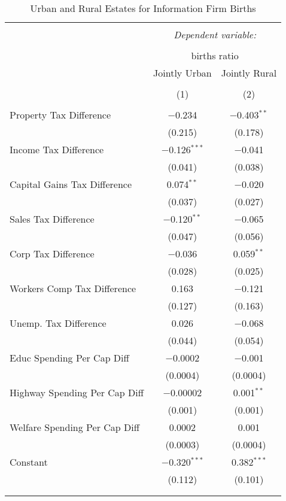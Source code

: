 
\begin{table}[!htbp] \centering 
  \caption{Urban and Rural Estates for  Information Firm Births} 
  \label{} 
\begin{tabular}{@{\extracolsep{5pt}}lcc} 
\\[-1.8ex]\hline 
\hline \\[-1.8ex] 
 & \multicolumn{2}{c}{\textit{Dependent variable:}} \\ 
\cline{2-3} 
\\[-1.8ex] & \multicolumn{2}{c}{births ratio} \\ 
 & Jointly Urban & Jointly Rural \\ 
\\[-1.8ex] & (1) & (2)\\ 
\hline \\[-1.8ex] 
 Property Tax Difference & $-$0.234 & $-$0.403$^{**}$ \\ 
  & (0.215) & (0.178) \\ 
  Income Tax Difference & $-$0.126$^{***}$ & $-$0.041 \\ 
  & (0.041) & (0.038) \\ 
  Capital Gains Tax Difference & 0.074$^{**}$ & $-$0.020 \\ 
  & (0.037) & (0.027) \\ 
  Sales Tax Difference & $-$0.120$^{**}$ & $-$0.065 \\ 
  & (0.047) & (0.056) \\ 
  Corp Tax Difference & $-$0.036 & 0.059$^{**}$ \\ 
  & (0.028) & (0.025) \\ 
  Workers Comp Tax Difference & 0.163 & $-$0.121 \\ 
  & (0.127) & (0.163) \\ 
  Unemp. Tax Difference & 0.026 & $-$0.068 \\ 
  & (0.044) & (0.054) \\ 
  Educ Spending Per Cap Diff & $-$0.0002 & $-$0.001 \\ 
  & (0.0004) & (0.0004) \\ 
  Highway Spending Per Cap Diff & $-$0.00002 & 0.001$^{**}$ \\ 
  & (0.001) & (0.001) \\ 
  Welfare Spending Per Cap Diff & 0.0002 & 0.001 \\ 
  & (0.0003) & (0.0004) \\ 
  Constant & $-$0.320$^{***}$ & 0.382$^{***}$ \\ 
  & (0.112) & (0.101) \\ 
 \hline \\[-1.8ex] 
\hline 
\hline \\[-1.8ex] 
\end{tabular} 
\end{table} 
